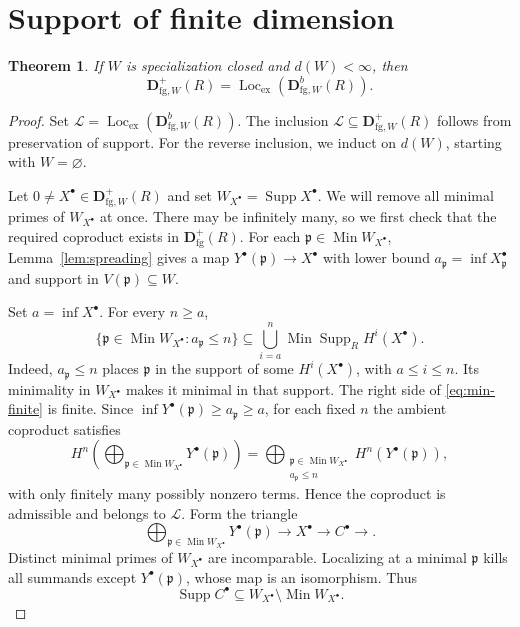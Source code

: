 \documentclass[11pt]{amsart}
\numberwithin{equation}{section}
\newtheorem{theorem}{Theorem}[section]
\theoremstyle{definition}
\theoremstyle{remark}
\DeclareMathOperator{\Supp}{Supp}
\DeclareMathOperator{\Min}{Min}
\DeclareMathOperator{\Loc}{Loc}
\newcommand{\D}{\mathbf D}
\newcommand{\fg}{\mathrm{fg}}
\newcommand{\Lex}{\Loc_{\mathrm{ex}}}
\newcommand{\p}{\mathfrak p}
\begin{document}
\section{Support of finite dimension}

\begin{theorem}\label{thm:geometric}
If $W$ is specialization closed and $d(W)<\infty$, then
\begin{equation}\label{eq:positive-geometric}
 \D^+_{\fg,W}(R)=\Lex(\D^b_{\fg,W}(R)).
\end{equation}
\end{theorem}
\begin{proof}
Set $\mathcal L=\Lex(\D^b_{\fg,W}(R))$. The inclusion
$\mathcal L\subseteq\D^+_{\fg,W}(R)$ follows from preservation of support.
For the reverse inclusion, we induct on $d(W)$, starting with
$W=\varnothing$.

Let $0\ne X^{\bullet}\in\D^+_{\fg,W}(R)$ and set
$W_{X^{\bullet}}=\Supp X^{\bullet}$. We will remove all minimal primes of
$W_{X^{\bullet}}$ at once. There may be infinitely many, so we first check
that the required coproduct exists in $\D^+_{\fg}(R)$.
For each $\p\in\Min W_{X^{\bullet}}$, Lemma~\ref{lem:spreading} gives a map
$Y^{\bullet}(\p)\to X^{\bullet}$ with lower bound
$a_\p=\inf X_\p^{\bullet}$ and support in $V(\p)\subseteq W$.

Set $a=\inf X^{\bullet}$. For every $n\geq a$,
\begin{equation}\label{eq:min-finite}
 \{\p\in\Min W_{X^{\bullet}}:a_\p\leq n\}
 \subseteq\bigcup_{i=a}^n\Min\Supp_R H^i(X^{\bullet}).
\end{equation}
Indeed, $a_\p\le n$ places $\p$ in the support of some
$H^i(X^{\bullet})$, with $a\le i\le n$. Its minimality in
$W_{X^{\bullet}}$ makes it minimal in that support. The right side of
\eqref{eq:min-finite} is finite. Since
$\inf Y^\bullet(\p)\ge a_\p\ge a$, for each fixed $n$ the ambient
coproduct satisfies
\[
 H^n\!\left(\bigoplus_{\p\in\Min W_{X^\bullet}}
                        Y^\bullet(\p)\right)
   =\bigoplus_{\substack{\p\in\Min W_{X^\bullet}\\a_\p\le n}}
                        H^n(Y^\bullet(\p)),
\]
with only finitely many possibly nonzero terms. Hence the coproduct
is admissible and belongs to $\mathcal L$. Form the triangle
\begin{equation}\label{eq:remove-min}
 \bigoplus_{\p\in\Min W_{X^{\bullet}}}Y^{\bullet}(\p)\longrightarrow X^{\bullet}\longrightarrow C^{\bullet}\longrightarrow.
\end{equation}
Distinct minimal primes of $W_{X^{\bullet}}$ are incomparable. Localizing at a minimal
$\p$ kills all summands except $Y^{\bullet}(\p)$, whose map is an isomorphism. Thus
\begin{equation}\label{eq:cone-support}
 \Supp C^{\bullet}\subseteq W_{X^{\bullet}}\setminus\Min W_{X^{\bullet}}.
\end{equation}


\end{proof}
\end{document}
